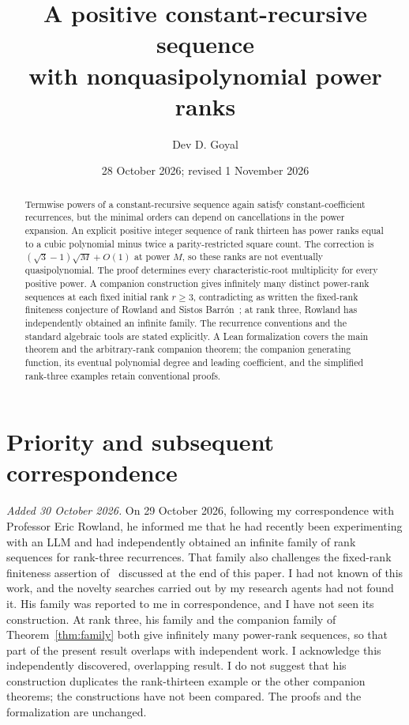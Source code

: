 \documentclass[11pt,a4paper]{article}
\title{A positive constant-recursive sequence\\with nonquasipolynomial power ranks}
\author{Dev D. Goyal}
\date{28 October 2026; revised 1 November 2026}
\begin{document}
\maketitle
\begin{abstract}
Termwise powers of a constant-recursive sequence again satisfy constant-coefficient
recurrences, but the minimal orders can depend on cancellations in the power
expansion. An explicit positive integer sequence of rank thirteen has power ranks
equal to a cubic polynomial minus twice a parity-restricted square count.
The correction is $(\sqrt3-1)\sqrt M+O(1)$ at power $M$, so these ranks are
not eventually quasipolynomial. The proof determines every characteristic-root
multiplicity for every positive power. A companion construction gives infinitely
many distinct power-rank sequences at each fixed initial rank $r\ge3$,
contradicting as written the fixed-rank finiteness conjecture of Rowland and
Sistos Barr\'on~\cite{RowlandSistos}; at rank three, Rowland has independently
obtained an infinite family. The recurrence conventions and the standard
algebraic tools are stated explicitly. A Lean formalization covers the main
theorem and the arbitrary-rank companion theorem; the companion generating
function, its eventual polynomial degree and leading coefficient, and the
simplified rank-three examples retain conventional proofs.
\end{abstract}

\section*{Priority and subsequent correspondence}
\emph{Added 30 October 2026.} On 29 October 2026, following my correspondence with Professor Eric Rowland, he informed me that he had recently been experimenting with an LLM and had independently obtained an infinite family of rank sequences for rank-three recurrences. That family also challenges the fixed-rank finiteness assertion of~\cite{RowlandSistos} discussed at the end of this paper. I had not known of this work, and the novelty searches carried out by my research agents had not found it. His family was reported to me in correspondence, and I have not seen its construction. At rank three, his family and the companion family of Theorem~\ref{thm:family} both give infinitely many power-rank sequences, so that part of the present result overlaps with independent work. I acknowledge this independently discovered, overlapping result. I do not suggest that his construction duplicates the rank-thirteen example or the other companion theorems; the constructions have not been compared. The proofs and the formalization are unchanged.
\end{document}
